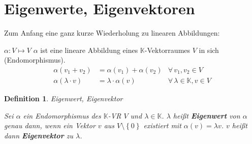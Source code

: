 \documentclass[%
a4paper,
11pt,		%
]
{scrartcl}
\newcommand{\K}{\mathbb{K}}
\theoremstyle{plain}
\newtheorem{mydef}{Definition}[section]
\theoremstyle{plain}
\theoremstyle{plain}
\theoremstyle{plain}
\theoremstyle{plain}
\begin{document}

\section{Eigenwerte, Eigenvektoren} %
\label{sec:Eigenwerte, Eigenvektoren}

Zum Anfang eine ganz kurze Wiederholung zu linearen Abbildungen:

$\alpha: V \mapsto V$ \hfill $\alpha$ ist eine lineare Abbildung eines $\K$-Vektorraumes $V$ in sich (Endomorphismus).
\begin{align*}
    \alpha(v_1 + v_2) & = \alpha(v_1) + \alpha(v_2) & \forall\, v_1,v_2 \in V\\
    \alpha(\lambda \cdot v) & = \lambda \cdot \alpha(v) & \forall\, \lambda \in \K, v \in V
\end{align*}

\begin{mydef}
    \textit{Eigenwert, Eigenvektor}

    Sei $\alpha$ ein Endomorphismus des $\K$-VR $V$ und $\lambda \in \K$. $\lambda$ heißt \textbf{Eigenwert} von $\alpha$ genau dann, wenn ein Vektor $v$ aus $V \setminus \left\{ 0 \right\}$ existiert mit $\alpha(v) = \lambda v$. $v$ heißt dann \textbf{Eigenvektor} zu $\lambda$.
\end{mydef}
\end{document}
